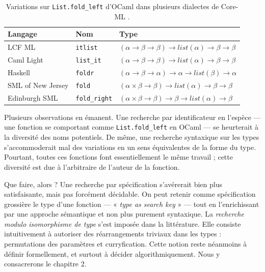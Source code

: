 \documentclass[a4paper]{report}
\theoremstyle{definition}
\begin{document}
\begin{table}[h]
  \centering
  \begin{tabular}{|l|l|l|}
    \hline
      Langage &
      Nom &
      Type
    \\
    \hline
      LCF ML \cite{LCF_ML} &
      \texttt{itlist} &
      $(\alpha \rightarrow \beta \rightarrow \beta) \rightarrow list (\alpha) \rightarrow \beta \rightarrow \beta$
    \\
      Caml Light \cite{Caml_Light} &
      \texttt{list\_it} &
      $(\alpha \rightarrow \beta \rightarrow \beta) \rightarrow list (\alpha) \rightarrow \beta \rightarrow \beta$
    \\
      Haskell \cite{Haskell} &
      \texttt{foldr} &
      $(\alpha \rightarrow \beta \rightarrow \alpha) \rightarrow \alpha \rightarrow list (\beta) \rightarrow \alpha$
    \\
      SML of New Jersey \cite{SML_New_Jersey} &
      \texttt{fold} &
      $(\alpha \times \beta \rightarrow \beta) \rightarrow list (\alpha) \rightarrow \beta \rightarrow \beta$
    \\
      Edinburgh SML \cite{Edinburgh_SML} &
      \texttt{fold\_right} &
      $(\alpha \times \beta \rightarrow \beta) \rightarrow \beta \rightarrow list (\alpha) \rightarrow \beta$
    \\
    \hline
  \end{tabular}
  \caption{\label{tab_fold} Variations sur \texttt{List.fold\_left} d'OCaml dans plusieurs dialectes de Core-ML \cite{Core_ML}.}
\end{table}

Plusieurs observations en émanent. Une recherche par identificateur en l'espèce — une fonction se comportant comme \texttt{List.fold\_left} en OCaml — se heurterait à la diversité des noms potentiels. De même, une recherche syntaxique sur les types s'accommoderait mal des variations en un sens équivalentes de la forme du type. Pourtant, toutes ces fonctions font essentiellement le même travail ; cette diversité est due à l'arbitraire de l'auteur de la fonction.

Que faire, alors ? Une recherche par spécification s'avérerait bien plus satisfaisante, mais pas forcément décidable. On peut retenir comme spécification grossière le type d'une fonction — « \textit{type as search key} » — tout en l'enrichissant par une approche sémantique et non plus purement syntaxique. La \textit{recherche modulo isomorphisme de type} s'est imposée dans la littérature. Elle consiste intuitivement à autoriser des réarrangements triviaux dans les types : permutations des paramètres et curryfication. Cette notion reste néanmoins à définir formellement, et surtout à décider algorithmiquement. Nous y consacrerons le chapitre 2.
\end{document}
